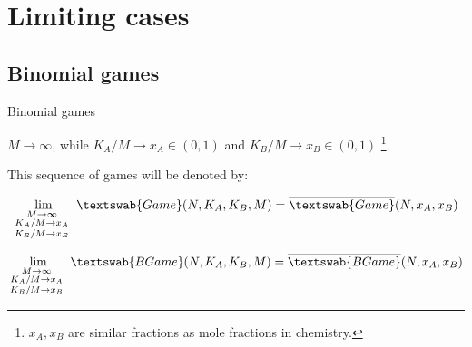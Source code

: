 \documentclass{beamer}
\theoremstyle{definition}
\begin{document}
\section{Limiting cases}

\subsection{Binomial games}

\begin{frame}{Binomial games}

$M \to \infty$, while $K_A/M \to x_A \in (0,1)$ and $K_B/M \to x_B \in (0,1)$ \footnote{$x_A, x_B$ are similar fractions as mole fractions in chemistry.}.

This sequence of games will be denoted by:

\begin{equation}
    \lim_{\begin{smallmatrix} M \to \infty & \\ K_A/M \to x_A \\ K_B/M \to x_B \end{smallmatrix}} \textswab{Game}(N, K_A, K_B, M) = \overline{\textswab{Game}}(N, x_A, x_B)
\end{equation}

\begin{equation}
    \lim_{\begin{smallmatrix} M \to \infty & \\ K_A/M \to x_A \\ K_B/M \to x_B \end{smallmatrix}} \textswab{BGame}(N, K_A, K_B, M) = \overline{\textswab{BGame}}(N, x_A, x_B)
\end{equation}
    
\end{frame}
\end{document}
